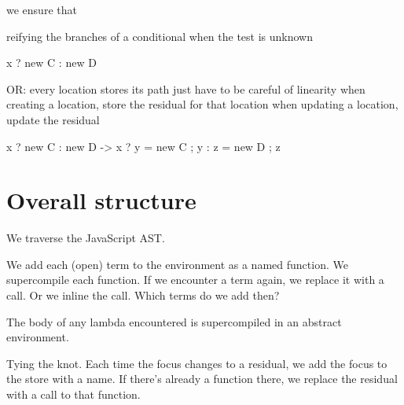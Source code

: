 {        we ensure that 

        reifying the branches of a conditional when the test is unknown

                x ? new C : new D

OR:
        every location stores its path
        just have to be careful of linearity
        when creating a location, store the residual for that location
        when updating a location, update the residual

                x ? new C : new D
        ->
                x ? { y = new C ; y }
                  : { z = new D ; z }


\section{Overall structure}

We traverse the JavaScript AST.

We add each (open) term to the environment as a named function.
We supercompile each function.
If we encounter a term again, we replace it with a call.
Or we inline the call.
Which terms do we add then?

The body of any lambda encountered is supercompiled in an abstract
environment.

Tying the knot.
Each time the focus changes to a residual, we add the focus to the store with
a name. If there's already a function there, we replace the residual with a
call to that function.

}

